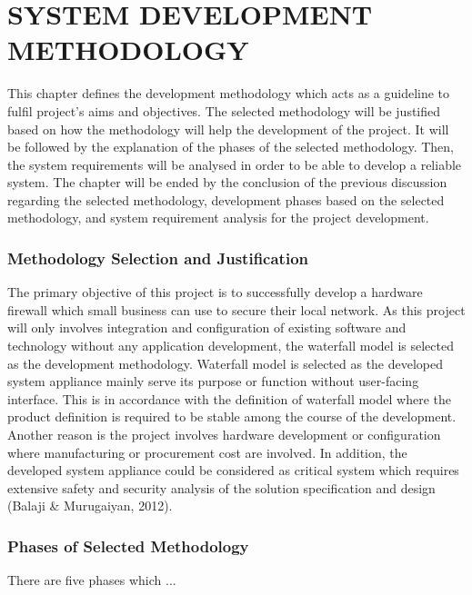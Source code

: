 \documentclass[../index.tex]{subfiles}
\begin{document}
\chapter{SYSTEM DEVELOPMENT METHODOLOGY}

This chapter defines the development methodology which acts as a guideline to fulfil project's aims
and objectives. The selected methodology will be justified based on how the methodology will help
the development of the project. It will be followed by the explanation of the phases of the selected
methodology. Then, the system requirements will be analysed in order to be able to develop a
reliable system. The chapter will be ended by the conclusion of the previous discussion regarding
the selected methodology, development phases based on the selected methodology, and system
requirement analysis for the project development.

\subsection{Methodology Selection and Justification}

The primary objective of this project is to successfully develop a hardware firewall which small
business can use to secure their local network. As this project will only involves integration and
configuration of existing software and technology without any application development, the waterfall
model is selected as the development methodology. Waterfall model is selected as the developed
system appliance mainly serve its purpose or function without user-facing interface. This is in
accordance with the definition of waterfall model where the product definition is required to be
stable among the course of the development. Another reason is the project involves hardware
development or configuration where manufacturing or procurement cost are involved. In addition, the
developed system appliance could be considered as critical system which requires extensive safety
and security analysis of the solution specification and design (Balaji \& Murugaiyan, 2012).

\subsection{Phases of Selected Methodology}

There are five phases which ...
\end{document}
